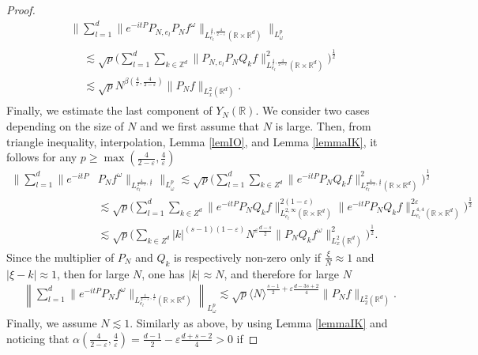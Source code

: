 \documentclass[10pt,leqno]{amsart}
\newcommand{\R}{\mathbb{R}} %
\numberwithin{equation}{section}
\newcommand{\Z}{\mathbb{Z}}
\begin{document}
\begin{proof}
\begin{multline*}
\bigg\|\sum_{l=1}^d \|e^{-it P} P_{N,e_l} P_N f^\omega \|_{L^{\frac{4}{\varepsilon},\frac{4}{2-\varepsilon}}_{e_l} (\R\times \R^d)} \bigg\|_{L_\omega^p}  \\
\begin{aligned}
 &\lesssim \sqrt{p} \bigg( \sum_{l = 1}^d \sum_{k \in \Z^d} \|P_{N,e_l} P_N Q_k f \|^2_{L^{\frac{4}{\varepsilon},\frac{4}{2-\varepsilon}}_{e_l} (\R\times \R^d)} \bigg)^{\frac{1}{2}} \\
& \lesssim \sqrt{p}N^{\beta (\frac{4}{\varepsilon},\frac{4}{2-\varepsilon})} \|P_N f\|_{L_x^2 (\R^d )}.
\end{aligned}
\end{multline*}
Finally, we estimate the last component of $Y_N (\R)$. We consider two cases depending on the size of $N$ and we first  assume that $N$ is large. Then,
from triangle inequality, interpolation,  Lemma \ref{lemIO}, and Lemma \ref{lemmaIK}, it follows for any $p \geq \max (\frac{4}{2-\varepsilon},\frac{4}{\varepsilon})$
\begin{align*}
\bigg\|\sum_{l=1}^d\|e^{-it P}  &P_N f^\omega \|_{ L^{\frac{4}{2-\varepsilon},\frac{4}{\varepsilon}}_{e_l} } \bigg\|_{L^p_\omega}
\lesssim \sqrt{p} \bigg(\sum_{l=1}^d \sum_{k \in Z^d} \| e^{-it P}  P_N Q_k f \|^2_{L^{\frac{4}{2-\varepsilon},\frac{4}{\varepsilon}}_{e_l} (\R\times \R^d)}\bigg)^{\frac{1}{2}}\\
&\lesssim  \sqrt{p} \bigg(\sum_{l=1}^d \sum_{k \in Z^d} \|e^{-it P}  P_N Q_k f\|_{L^{2,\infty}_{e_l} (\R \times \R^d)}^{2(1-\varepsilon)} \|e^{-it P}  P_N Q_k f\|_{L^{4,4}_{e_l}(\R \times \R^d) }^{2\varepsilon} 
\bigg)^{\frac{1}{2}}\\
&\lesssim\sqrt{p} \bigg( \sum_{k \in Z^d} |k|^{(s-1)(1-\varepsilon)} N^{\varepsilon \frac{d -s}{2} } \|P_N Q_k f^\omega\|^2_{L_x^2 (\R^d)} \bigg)^{\frac{1}{2}}.
\end{align*}
Since the multiplier of $P_N$ and $Q_k$ is respectively non-zero only if $\frac{\xi}{N} \approx 1$ and $|\xi - k| \approx 1$, then for large $N$, one has $|k|\approx N$, and therefore 
for large $N$
\begin{align*}
&\left\|\sum_{l=1}^d \|e^{-it P}  P_N f^\omega \|_{  L^{\frac{4}{2-\varepsilon},\frac{4}{\varepsilon}}_{e_l} (\R\times \R^d)} \right\|_{L_\omega^p}
\lesssim \sqrt{p}\langle N\rangle^{\frac{s-1}{2} + \varepsilon  \frac{d -3s+2}{4}} \|P_N f\|_{L_2^2 (\R^d )}.
\end{align*}
Finally, we assume $N \lesssim 1$. Similarly as above, by using Lemma \ref{lemmaIK} and noticing that $\alpha (\frac{4}{2-\varepsilon},\frac{4}{\varepsilon} )= \frac{d-1}{2}- \varepsilon \frac{d+s -2}{4}>0$ if 

\end{proof}
\end{document}
